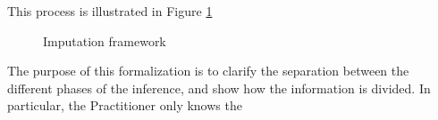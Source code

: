 This process is illustrated in Figure \ref{fig.tikz_imp}

\begin{figure}[H]
  \caption{Imputation framework}
  \label{fig.tikz_imp}
\end{figure}

The purpose of this formalization is to clarify the separation between the different phases of the inference, and show how the information is divided. In particular, the Practitioner only knows the 